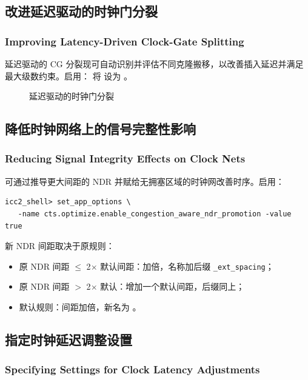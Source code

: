 \subsection{改进延迟驱动的时钟门分裂}
\subsubsection*{Improving Latency-Driven Clock-Gate Splitting}

延迟驱动的 CG 分裂现可自动识别并评估不同克隆搬移，以改善插入延迟并满足最大级数约束。启用：
将  设为 。

\begin{figure}[htbp]
\centering
{}
\caption{延迟驱动的时钟门分裂}
\label{fig:cts-cg-split}
\end{figure}

\subsection{降低时钟网络上的信号完整性影响}
\subsubsection*{Reducing Signal Integrity Effects on Clock Nets}

可通过推导更大间距的 NDR 并赋给无拥塞区域的时钟网改善时序。启用：
\begin{lstlisting}
icc2_shell> set_app_options \
   -name cts.optimize.enable_congestion_aware_ndr_promotion -value true
\end{lstlisting}
新 NDR 间距取决于原规则：
\begin{itemize}
  \item 原 NDR 间距 $\leq$ 2$\times$ 默认间距：加倍，名称加后缀 \texttt{\_ext\_spacing}；
  \item 原 NDR 间距 $>$ 2$\times$ 默认：增加一个默认间距，后缀同上；
  \item 默认规则：间距加倍，新名为 。
\end{itemize}

\subsection{指定时钟延迟调整设置}
\subsubsection*{Specifying Settings for Clock Latency Adjustments}

